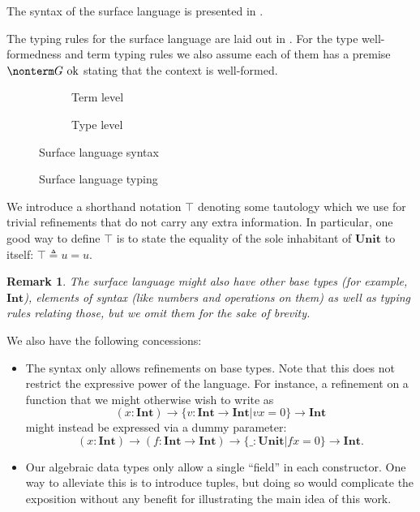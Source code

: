 \documentclass[a4paper]{article}
\newtheorem{remark}{Remark}
\newcommand{\unit}{u}
\newcommand{\Unit}{\textbf{Unit}}
\newcommand{\Int}{\textbf{Int}}
\newcommand{\ctxok}{\text{~ok}}
\begin{document}
The syntax of the surface language is presented in .

The typing rules for the surface language are laid out in .
For the type well-formedness and term typing rules
we also assume each of them has a premise $\nonterm G \ctxok$
stating that the context is well-formed.

\begin{figure}[ht]
  \footnotesize
  \begin{subfigure}{.6\textwidth}
    \caption{Term level}
  \end{subfigure}
  \begin{subfigure}{.5\textwidth}
    \caption{Type level}
  \end{subfigure}
  \caption{Surface language syntax}
  \label{fig:surface_syntax}
\end{figure}

\begin{figure}[ht]
  \footnotesize
  \drules[TCTX]{$\nonterm G \ctxok$}{context well-formedness}{Empty,Bind}
  \caption{Surface language typing}
  \label{fig:surface_typing}
\end{figure}

We introduce a shorthand notation $\top$ denoting some tautology
which we use for trivial refinements that do not carry any extra information.
In particular, one good way to define $\top$ is
to state the equality of the sole inhabitant of $\Unit$ to itself:
$\top \triangleq \unit = \unit$.

\begin{remark}\label{remark:surface_base_types}
  The surface language might also have other base types (for example, $\Int$),
  elements of syntax (like numbers and operations on them)
  as well as typing rules relating those,
  but we omit them for the sake of brevity.
\end{remark}

We also have the following concessions:
\begin{itemize}
  \item The syntax only allows refinements on base types.
    Note that this does not restrict the expressive power of the language.
    For instance, a refinement on a function that we might otherwise wish to write as
    \[
      (x : \Int) \rightarrow \{ v : \Int \rightarrow \Int | v x = 0 \} \rightarrow \Int
    \]
    might instead be expressed via a dummy parameter:
    \[
      (x : \Int) \rightarrow (f : \Int \rightarrow \Int) \rightarrow \{ \_ : \Unit | f x = 0 \} \rightarrow \Int.
    \]
  \item Our algebraic data types only allow a single ``field'' in each constructor.
    One way to alleviate this is to introduce tuples,
    but doing so would complicate the exposition
    without any benefit for illustrating the main idea of this work.
\end{itemize}
\end{document}
